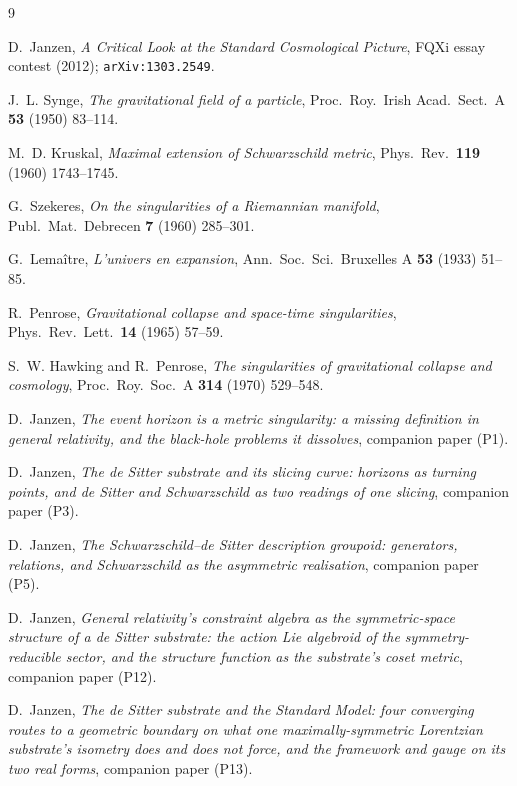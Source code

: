 \documentclass[11pt,a4paper]{article}
\theoremstyle{definition}
\begin{document}
\begin{thebibliography}{9}

 D.~Janzen, \emph{A Critical Look at the Standard Cosmological Picture}, FQXi essay contest (2012); \texttt{arXiv:1303.2549}.

J.~L. Synge,
\emph{The gravitational field of a particle},
Proc.~Roy.~Irish Acad.~Sect.~A \textbf{53} (1950) 83--114.

M.~D. Kruskal,
\emph{Maximal extension of Schwarzschild metric},
Phys.~Rev.~\textbf{119} (1960) 1743--1745.

G.~Szekeres,
\emph{On the singularities of a Riemannian manifold},
Publ.~Mat.~Debrecen \textbf{7} (1960) 285--301.

G.~Lemaître,
\emph{L'univers en expansion},
Ann.~Soc.~Sci.~Bruxelles A \textbf{53} (1933) 51--85.

R.~Penrose,
\emph{Gravitational collapse and space-time singularities},
Phys.~Rev.~Lett.~\textbf{14} (1965) 57--59.

S.~W. Hawking and R.~Penrose,
\emph{The singularities of gravitational collapse and cosmology},
Proc.~Roy.~Soc.~A \textbf{314} (1970) 529--548.

D.~Janzen,
\emph{The event horizon is a metric singularity: a missing definition in general relativity, and the black-hole problems it dissolves}, companion paper (P1).

D.~Janzen,
\emph{The de Sitter substrate and its slicing curve: horizons as turning points, and de Sitter and Schwarzschild as two readings of one slicing}, companion paper (P3).

D.~Janzen,
\emph{The Schwarzschild--de Sitter description groupoid: generators, relations, and Schwarzschild as the asymmetric realisation}, companion paper (P5).

D.~Janzen,
\emph{General relativity's constraint algebra as the symmetric-space structure of a de Sitter substrate: the action Lie algebroid of the symmetry-reducible sector, and the structure function as the substrate's coset metric}, companion paper (P12).

 D.~Janzen, \emph{The de Sitter substrate and the Standard Model: four converging routes to a geometric boundary on what one maximally-symmetric Lorentzian substrate's isometry does and does not force, and the framework and gauge on its two real forms}, companion paper (P13).


\end{thebibliography}
\end{document}
